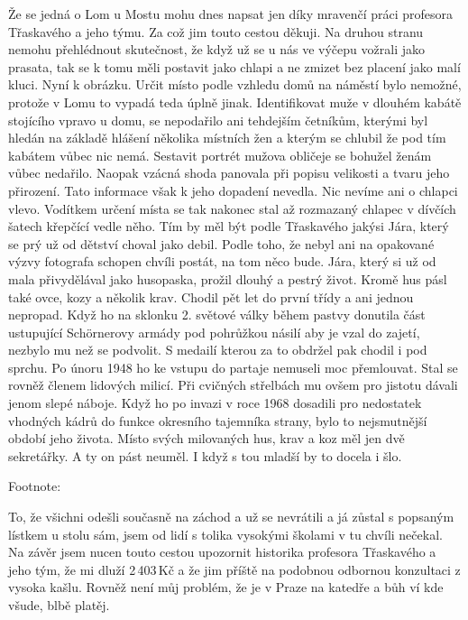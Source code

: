 
Že se jedná o Lom u Mostu mohu dnes napsat jen díky mravenčí práci
profesora Třaskavého a jeho týmu. Za což jim touto cestou děkuji. Na
druhou stranu nemohu přehlédnout skutečnost, že když už se u nás ve
výčepu vožrali jako prasata, tak se k tomu měli postavit jako chlapi a
ne zmizet bez placení jako malí kluci. Nyní k obrázku. Určit místo
podle vzhledu domů na náměstí bylo nemožné, protože v Lomu to vypadá
teda úplně jinak. Identifikovat muže v dlouhém kabátě stojícího vpravo
u domu, se nepodařilo ani tehdejším četníkům, kterými byl hledán na
základě hlášení několika místních žen a kterým se chlubil že pod tím
kabátem vůbec nic nemá. Sestavit portrét mužova obličeje se bohužel
ženám vůbec nedařilo. Naopak vzácná shoda panovala při popisu
velikosti a tvaru jeho přirození. Tato informace však k jeho dopadení
nevedla. Nic nevíme ani o chlapci vlevo. Vodítkem určení místa se tak
nakonec stal až rozmazaný chlapec v dívčích šatech křepčící vedle
něho. Tím by měl být podle Třaskavého jakýsi Jára, který se prý už od
dětství choval jako debil. Podle toho, že nebyl ani na opakované výzvy
fotografa schopen chvíli postát, na tom něco bude. Jára, který si už
od mala přivydělával jako husopaska, prožil dlouhý a pestrý život.
Kromě hus pásl také ovce, kozy a několik krav. Chodil pět let do první
třídy a ani jednou nepropad. Když ho na sklonku 2. světové války během
pastvy donutila část ustupující Schörnerovy armády pod pohrůžkou
násilí aby je vzal do zajetí, nezbylo mu než se podvolit. S medailí
kterou za to obdržel pak chodil i pod sprchu. Po únoru 1948 ho ke
vstupu do partaje nemuseli moc přemlouvat. Stal se rovněž členem
lidových milicí. Při cvičných střelbách mu ovšem pro jistotu dávali
jenom slepé náboje. Když ho po invazi v roce 1968 dosadili pro
nedostatek vhodných kádrů do funkce okresního tajemníka strany, bylo
to nejsmutnější období jeho života. Místo svých milovaných hus, krav a
koz měl jen dvě sekretářky. A ty on pást neuměl. I když s tou mladší by
to docela i šlo.

Footnote:

To, že všichni odešli současně na záchod a už se nevrátili a já zůstal
s popsaným lístkem u stolu sám, jsem od lidí s tolika vysokými školami
v tu chvíli nečekal. Na závěr jsem nucen touto cestou upozornit
historika profesora Třaskavého a jeho tým, že mi dluží 2\,403\,Kč a že
jim příště na podobnou odbornou konzultaci z vysoka kašlu. Rovněž není
můj problém, že je v Praze na katedře a bůh ví kde všude, blbě platěj.


